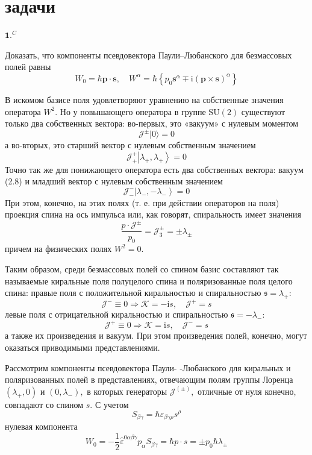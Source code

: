 \documentclass[a4paper,12pt]{article} %
\begin{document}
\section{задачи}


\begin{ttask}$\mathbf{1.}^{C}$ 

Доказать, что компоненты псевдовектора Паули–Любанского для
безмассовых полей равны
$$
W_{0}=
\hbar \boldsymbol{p} \cdot \boldsymbol{s}, 
\quad 
W^{\alpha}=
\hbar\left\{p_{0} \boldsymbol{s}^{\alpha} \mp \mathrm{i}(\boldsymbol{p} \times \boldsymbol{s})^{\alpha}\right\}
$$


В искомом базисе поля удовлетворяют уравнению на собственные значения оператора $W^{2}$. Но у повышающего оператора в группе $\mathrm{SU}(2)$ существуют только два собственных вектора: во-первых, это «вакуум» с нулевым моментом
$$
\mathcal{J}^{\pm}|0\rangle=0
$$
а во-вторых, это старший вектор с нулевым собственным значением
$$
\mathcal{J}_{+}^{+}\left|\lambda_{+}, \lambda_{+}\right\rangle=0
$$
Точно так же для понижающего оператора есть два собственных вектора:
вакуум (2.8) и младший вектор с нулевым собственным значением
$$
\mathcal{J}_{-}^{-}\left|\lambda_{-},-\lambda_{-}\right\rangle=0
$$
При этом, конечно, на этих полях (т. е. при действии операторов на поля)
проекция спина на ось импульса или, как говорят, спиральность имеет значения
$$
\frac{p \cdot \mathcal{J}^{\pm}}{p_{0}}=\mathcal{J}_{3}^{\pm}=\pm \lambda_{\pm}
$$
причем на физических полях $W^{2}=0 .$


Таким образом, среди безмассовых полей со спином базис составляют так называемые киральные поля полуцелого спина и поляризованные поля целого спина:
правые поля с положительной киральностью и спиральностью $\mathfrak{s}=\lambda_{+}:$
$$
\mathcal{J}^{-} \equiv 0 \Rightarrow \mathcal{K}=-\mathrm{i} s, \quad \mathcal{J}^{+}=s
$$
левые поля с отрицательной киральностью и спиральностью $\mathfrak{s}=-\lambda_{-}:$
$$
\mathcal{J}^{+} \equiv 0 \Rightarrow \mathcal{K}=\mathrm{i} s, \quad \mathcal{J}^{-}=s
$$
а также их произведения и вакуум. При этом произведения полей, конечно, могут оказаться приводимыми представлениями.

Рассмотрим компоненты псевдовектора Паули- -Любанского для киральных и поляризованных полей в представлениях, отвечающим полям группы Лоренца $\left(\lambda_{+}, 0\right)$ и $\left(0, \lambda_{-}\right),$ в которых генераторы $\mathcal{J}^{(\pm)},$ отличные от нуля конечно, совпадают со спином $s .$ С учетом
$$
S_{\beta \gamma}=\hbar \varepsilon_{\beta \gamma \rho} s^{\rho}
$$
нулевая компонента
$$
W_{0}=-\frac{1}{2} \hat{\varepsilon}^{0 \alpha \beta \gamma} p_{\alpha} S_{\beta \gamma}=\hbar p \cdot s=\pm p_{0} \hbar \lambda_{\pm}
$$



\end{ttask}
\end{document}
